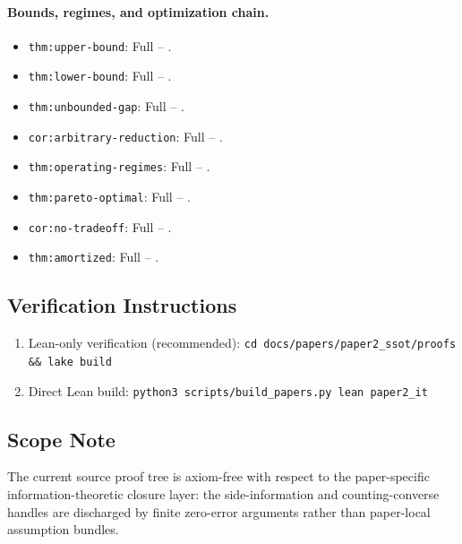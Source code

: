 \paragraph{Bounds, regimes, and optimization chain.}
\begin{itemize}
\item \nolinkurl{thm:upper-bound}: Full -- .
\item \nolinkurl{thm:lower-bound}: Full -- .
\item \nolinkurl{thm:unbounded-gap}: Full -- .
\item \nolinkurl{cor:arbitrary-reduction}: Full -- .
\item \nolinkurl{thm:operating-regimes}: Full -- .
\item \nolinkurl{thm:pareto-optimal}: Full -- .
\item \nolinkurl{cor:no-tradeoff}: Full -- .
\item \nolinkurl{thm:amortized}: Full -- .
\end{itemize}
\endgroup

\subsection*{Verification Instructions}

\begin{enumerate}
\item Lean-only verification (recommended):
\texttt{cd docs/papers/paper2\_ssot/proofs \&\& lake build}
\item Direct Lean build:
\texttt{python3 scripts/build\_papers.py lean paper2\_it}
\end{enumerate}

\subsection*{Scope Note}

The current source proof tree is axiom-free with respect to the paper-specific information-theoretic closure layer: the side-information and counting-converse handles are discharged by finite zero-error arguments rather than paper-local assumption bundles.
